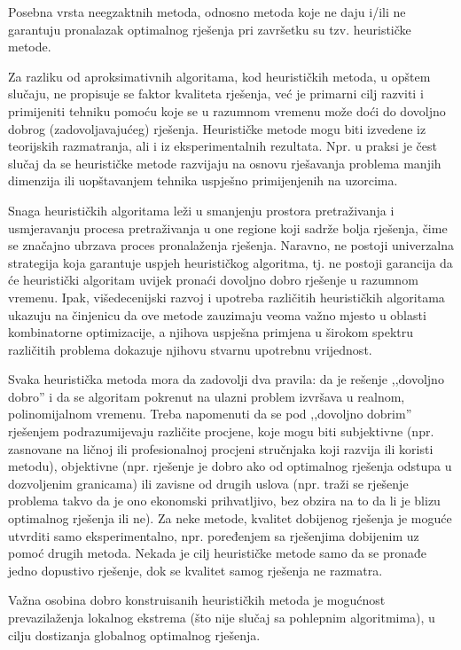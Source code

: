 \documentclass[b5paper, utf8, 11pt, colorlinks]{book}
\theoremstyle{definition}
\begin{document}
 Posebna vrsta neegzaktnih metoda, odnosno metoda koje ne daju i/ili ne garantuju pronalazak optimalnog rješenja pri završetku su tzv. heurističke metode. 
 
 Za razliku od aproksimativnih algoritama, kod heurističkih metoda, u opštem slučaju, ne propisuje se faktor kvaliteta rješenja, već je primarni cilj razviti i primijeniti tehniku pomoću koje se u razumnom vremenu može doći do dovoljno dobrog (zadovoljavajućeg) rješenja. Heurističke metode mogu biti izvedene iz teorijskih razmatranja, ali i iz eksperimentalnih rezultata. Npr. u praksi je čest slučaj da se heurističke metode razvijaju na osnovu rješavanja problema manjih dimenzija ili uopštavanjem tehnika uspješno primijenjenih na uzorcima. 
 
 
 Snaga heurističkih algoritama leži u smanjenju prostora pretraživanja i usmjeravanju procesa pretraživanja u one regione koji sadrže bolja rješenja, čime se značajno ubrzava proces pronalaženja rješenja. Naravno, ne postoji univerzalna strategija koja garantuje uspjeh heurističkog algoritma, tj. ne postoji garancija da će heuristički algoritam uvijek pronaći dovoljno dobro rješenje u razumnom vremenu. Ipak, višedecenijski razvoj i upotreba različitih heurističkih algoritama ukazuju na činjenicu da ove metode zauzimaju veoma važno mjesto u oblasti kombinatorne optimizacije, a njihova uspješna primjena u širokom spektru različitih problema dokazuje njihovu stvarnu upotrebnu vrijednost.
 
 
 Svaka heuristička metoda mora da zadovolji dva pravila: da je rešenje ,,dovoljno
 dobro'' i da se algoritam pokrenut na ulazni problem izvršava u realnom, polinomijalnom vremenu. Treba napomenuti da se pod  ,,dovoljno
 dobrim'' rješenjem podrazumijevaju različite procjene, koje mogu biti subjektivne (npr. zasnovane na ličnoj ili profesionalnoj procjeni stručnjaka koji razvija ili koristi metodu), objektivne (npr.  rješenje je dobro ako od optimalnog rješenja odstupa u dozvoljenim granicama) ili zavisne od drugih uslova (npr. traži se rješenje problema takvo da je ono ekonomski prihvatljivo, bez obzira na to da li je blizu optimalnog rješenja ili ne). 
 Za neke metode, kvalitet dobijenog rješenja je moguće utvrditi samo eksperimentalno, npr. poređenjem sa rješenjima dobijenim uz pomoć drugih metoda. Nekada je cilj heurističke metode samo da se pronađe jedno dopustivo rješenje, dok se kvalitet samog rješenja ne razmatra.
 
 Važna osobina dobro konstruisanih heurističkih metoda je mogućnost prevazilaženja lokalnog ekstrema (što nije slučaj sa pohlepnim algoritmima), u cilju dostizanja globalnog optimalnog rješenja. 
 
\end{document}
